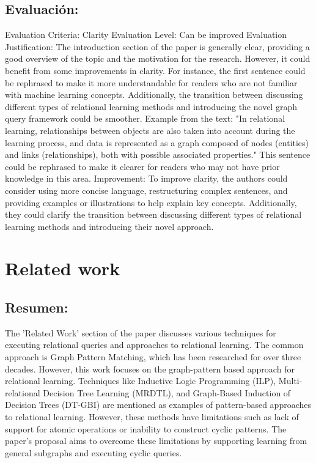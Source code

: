 \documentclass{article}%
\begin{document}
\subsection{Evaluación:}%
\label{subsec:Evaluacin}%
Evaluation Criteria: Clarity\newline%
\newline%
Evaluation Level: Can be improved\newline%
\newline%
Evaluation Justification: The introduction section of the paper is generally clear, providing a good overview of the topic and the motivation for the research. However, it could benefit from some improvements in clarity. For instance, the first sentence could be rephrased to make it more understandable for readers who are not familiar with machine learning concepts. Additionally, the transition between discussing different types of relational learning methods and introducing the novel graph query framework could be smoother.\newline%
\newline%
Example from the text: "In relational learning, relationships between objects are also taken into account during the learning process, and data is represented as a graph composed of nodes (entities) and links (relationships), both with possible associated properties." This sentence could be rephrased to make it clearer for readers who may not have prior knowledge in this area.\newline%
\newline%
Improvement: To improve clarity, the authors could consider using more concise language, restructuring complex sentences, and providing examples or illustrations to help explain key concepts. Additionally, they could clarify the transition between discussing different types of relational learning methods and introducing their novel approach.

%
\clearpage%
\section{Related work}%
\label{sec:Relatedwork}%
\subsection{Resumen:}%
\label{subsec:Resumen}%
The 'Related Work' section of the paper discusses various techniques for executing relational queries and approaches to relational learning. The common approach is Graph Pattern Matching, which has been researched for over three decades. However, this work focuses on the graph{-}pattern based approach for relational learning. Techniques like Inductive Logic Programming (ILP), Multi{-}relational Decision Tree Learning (MRDTL), and Graph{-}Based Induction of Decision Trees (DT{-}GBI) are mentioned as examples of pattern{-}based approaches to relational learning. However, these methods have limitations such as lack of support for atomic operations or inability to construct cyclic patterns. The paper's proposal aims to overcome these limitations by supporting learning from general subgraphs and executing cyclic queries.
\end{document}
